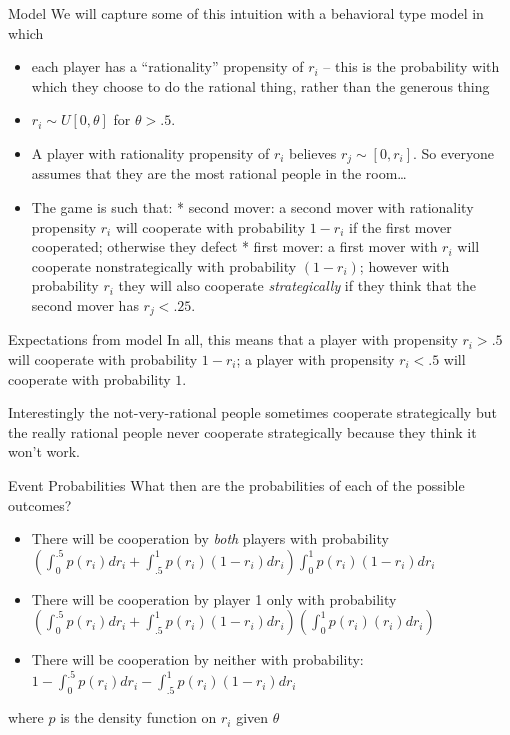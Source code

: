 \documentclass[
  11pt,
  ignorenonframetext,
]{beamer}
\providecommand{\tightlist}{%
  \setlength{\itemsep}{0pt}\setlength{\parskip}{0pt}}\usepackage{longtable,booktabs,array}
\begin{document}
\begin{frame}{Model}
\protect\hypertarget{model-2}{}
We will capture some of this intuition with a behavioral type model in
which

\begin{itemize}
\tightlist
\item
  each player has a ``rationality'' propensity of \(r_i\) -- this is the
  probability with which they choose to do the rational thing, rather
  than the generous thing
\item
  \(r_i \sim U[0, \theta]\) for \(\theta > .5\).
\item
  A player with rationality propensity of \(r_i\) believes
  \(r_j \sim [0, r_i]\). So everyone assumes that they are the most
  rational people in the room\ldots{}
\item
  The game is such that: * second mover: a second mover with rationality
  propensity \(r_i\) will cooperate with probability \(1-r_i\) if the
  first mover cooperated; otherwise they defect * first mover: a first
  mover with \(r_i\) will cooperate nonstrategically with probability
  \((1-r_i)\); however with probability \(r_i\) they will also cooperate
  \emph{strategically} if they think that the second mover has
  \(r_j<.25\).
\end{itemize}
\end{frame}

\begin{frame}{Expectations from model}
\protect\hypertarget{expectations-from-model-1}{}
In all, this means that a player with propensity \(r_i>.5\) will
cooperate with probability \(1-r_i\); a player with propensity
\(r_i<.5\) will cooperate with probability \(1\).

Interestingly the not-very-rational people sometimes cooperate
strategically but the really rational people never cooperate
strategically because they think it won't work.
\end{frame}

\begin{frame}{Event Probabilities}
\protect\hypertarget{event-probabilities-2}{}
What then are the probabilities of each of the possible outcomes?

\begin{itemize}
\tightlist
\item
  There will be cooperation by \emph{both} players with probability
  \((\int_0^{.5} p(r_i) dr_i + \int_{.5}^1 p(r_i)(1-r_i) dr_i)\int_0^1p(r_i)(1-r_i)dr_i\)
\item
  There will be cooperation by player 1 only with probability
  \((\int_0^{.5} p(r_i) dr_i + \int_{.5}^1 p(r_i)(1-r_i) dr_i)(\int_0^1p(r_i)(r_i)dr_i)\)
\item
  There will be cooperation by neither with probability:
  \(1-\int_0^{.5} p(r_i) dr_i - \int_{.5}^1 p(r_i)(1-r_i) dr_i\)
\end{itemize}

where \(p\) is the density function on \(r_i\) given \(\theta\)
\end{frame}
\end{document}
